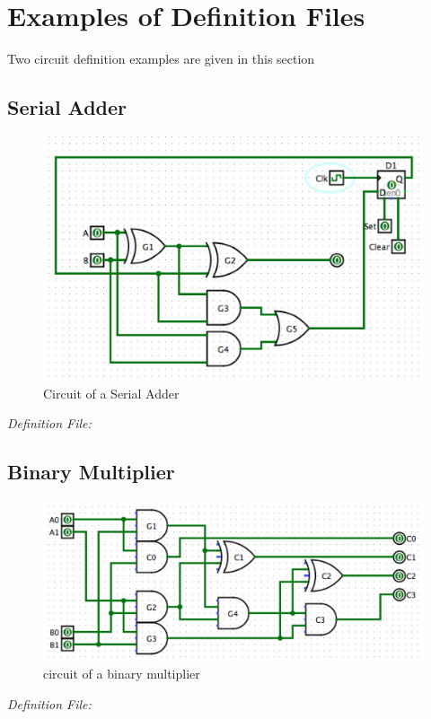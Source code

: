 \documentclass[12pt]{article}
\def\n{\noindent}
\begin{document}
\section{Examples of Definition Files}
\n Two circuit definition examples are given in this section\par

\subsection{Serial Adder}
\begin{figure}[H]
    \centering
    \includegraphics[scale=0.55]{sequential_carry_adder.png}
    \caption{Circuit of a Serial Adder}
\end{figure}

\emph{Definition File:}



\subsection{Binary Multiplier}
\begin{figure}[H]
    \centering
    \includegraphics[scale=0.55]{bin_multiplier.png}
    \caption{circuit of a binary multiplier}
\end{figure}
\emph{Definition File:}

\end{document}
